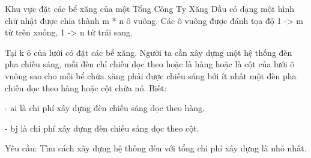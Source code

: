Khu vực đặt các bể xăng của một Tổng Công Ty Xăng Dầu có dạng một hình chữ nhật được chia thành m * n ô vuông. Các ô vuông được đánh tọa độ 1 -> m từ trên xuống, 1 -> n từ trái sang.   


   Tại k ô của lưới có đặt các bể xăng. Người ta cần xây dựng một hệ thống đèn pha chiếu sáng, mỗi đèn chỉ chiếu dọc theo hoặc là hàng hoặc là cột của lưới ô vuông sao cho mỗi bể chứa xăng phải được chiếu sáng bởi ít nhất một đèn pha chiếu dọc theo hàng hoặc cột chứa nó. Biết:   


   - ai là chi phí xây dựng đèn chiếu sáng dọc theo hàng.   


   - bj là chi phí xây dựng đèn chiếu sáng dọc theo cột.  

       Yêu cầu:      Tìm cách xây dựng hệ thống đèn với tổng chi phí xây dựng là nhỏ nhất.